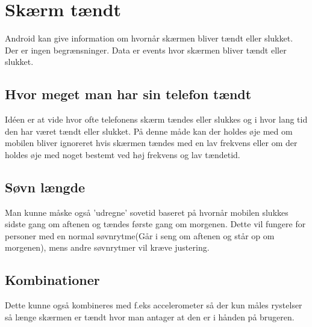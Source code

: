 \section{Skærm tændt}
Android kan give information om hvornår skærmen bliver tændt eller slukket. Der er ingen begrænsninger. Data er events hvor skærmen bliver tændt eller slukket.

\subsection{Hvor meget man har sin telefon tændt}
Idéen er at vide hvor ofte telefonens skærm tændes eller slukkes og i hvor lang tid den har været tændt eller slukket. På denne måde kan der holdes øje med om mobilen bliver ignoreret hvis skærmen tændes med en lav frekvens eller om der holdes øje med noget bestemt ved høj frekvens og lav tændetid. 

\subsection{Søvn længde}
Man kunne måske også 'udregne' sovetid baseret på hvornår mobilen slukkes sidste gang om aftenen og tændes første gang om morgenen. Dette vil fungere for personer med en normal søvnrytme(Går i seng om aftenen og står op om morgenen), mens andre søvnrytmer vil kræve justering.

\subsection{Kombinationer}
Dette kunne også kombineres med f.eks accelerometer så der kun måles rystelser så længe skærmen er tændt hvor man antager at den er i hånden på brugeren.


